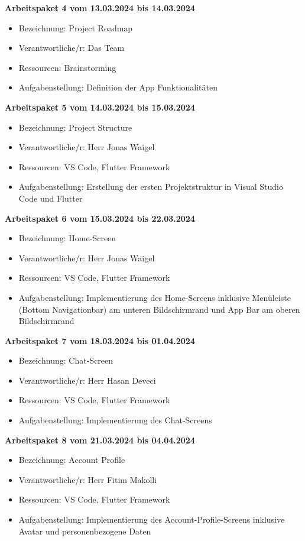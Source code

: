 \newpage
\textbf{Arbeitspaket 4 vom 13.03.2024 bis 14.03.2024}
\begin{itemize}[itemsep=0pt]
    \item{Bezeichnung: Project Roadmap} 
	\item{Verantwortliche/r: Das Team} 
	\item{Ressourcen: Brainstorming} 
	\item{Aufgabenstellung: Definition der App Funktionalitäten}
\end{itemize} 

\textbf{Arbeitspaket 5 vom 14.03.2024 bis 15.03.2024}
\begin{itemize}[itemsep=0pt]
    \item{Bezeichnung: Project Structure} 
	\item{Verantwortliche/r: Herr Jonas Waigel} 
	\item{Ressourcen: VS Code, Flutter Framework} 
    \item{Aufgabenstellung: Erstellung der ersten Projektstruktur in Visual Studio Code und Flutter}
\end{itemize}

\textbf{Arbeitspaket 6 vom 15.03.2024 bis 22.03.2024}
\begin{itemize}[itemsep=0pt]
    \item{Bezeichnung: Home-Screen} 
	\item{Verantwortliche/r: Herr Jonas Waigel} 
	\item{Ressourcen: VS Code, Flutter Framework} 
    \item{Aufgabenstellung: Implementierung des Home-Screens inklusive Menüleiste (Bottom Navigationbar) am unteren Bildschirmrand und App Bar am oberen Bildschirmrand}
\end{itemize}

\textbf{Arbeitspaket 7 vom 18.03.2024 bis 01.04.2024}
\begin{itemize}[itemsep=0pt]
    \item{Bezeichnung: Chat-Screen} 
	\item{Verantwortliche/r: Herr Hasan Deveci} 
	\item{Ressourcen: VS Code, Flutter Framework} 
    \item{Aufgabenstellung: Implementierung des Chat-Screens}
\end{itemize} 

\textbf{Arbeitspaket 8 vom 21.03.2024 bis 04.04.2024}
\begin{itemize}[itemsep=0pt]
    \item{Bezeichnung: Account Profile} 
	\item{Verantwortliche/r: Herr Fitim Makolli} 
	\item{Ressourcen: VS Code, Flutter Framework} 
    \item{Aufgabenstellung: Implementierung des Account-Profile-Screens inklusive Avatar und personenbezogene Daten}
\end{itemize}

